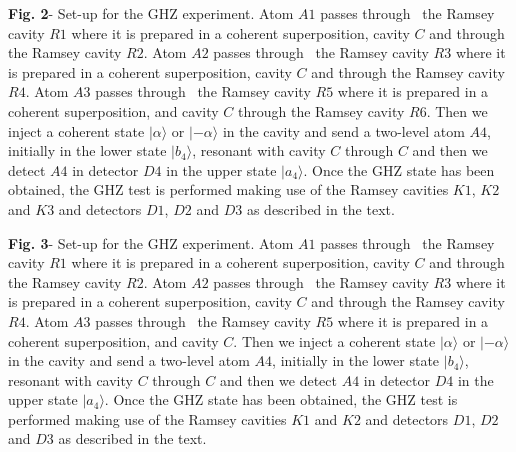 \documentclass[12pt,thmsa]{article}
\begin{document}
\textbf{Fig. 2}- Set-up for the GHZ experiment. Atom $A1$ passes through \
the Ramsey cavity $R1$ where it is prepared in a coherent superposition,
cavity $C$ and through the Ramsey cavity $R2.$ Atom $A2$ passes through \
the Ramsey cavity $R3$ where it is prepared in a coherent superposition,
cavity $C$ and through the Ramsey cavity $R4$. Atom $A3$ passes through \
the Ramsey cavity $R5$ where it is prepared in a coherent superposition, and
cavity $C$ through the Ramsey cavity $R6$. Then we inject a coherent state $%
|\alpha \rangle $ or $|-\alpha \rangle $ in the cavity and send a two-level
atom $A4$, initially in the lower state $|b_{4}\rangle $, resonant with
cavity $C$ through $C$ and then we detect $A4$ in detector $D4$ in the upper
state $|a_{4}\rangle $. Once the GHZ state has been obtained, the GHZ test
is performed making use of the Ramsey cavities $K1$, $K2$ and $K3$ and
detectors $D1$, $D2$ and $D3$ as described in the text.\bigskip

\textbf{Fig. 3}- Set-up for the GHZ experiment. Atom $A1$ passes through \
the Ramsey cavity $R1$ where it is prepared in a coherent superposition,
cavity $C$ and through the Ramsey cavity $R2.$ Atom $A2$ passes through \
the Ramsey cavity $R3$ where it is prepared in a coherent superposition,
cavity $C$ and through the Ramsey cavity $R4$. Atom $A3$ passes through \
the Ramsey cavity $R5$ where it is prepared in a coherent superposition, and
cavity $C$. Then we inject a coherent state $|\alpha \rangle $ or $|-\alpha
\rangle $ in the cavity and send a two-level atom $A4$, initially in the
lower state $|b_{4}\rangle $, resonant with cavity $C$ through $C$ and then
we detect $A4$ in detector $D4$ in the upper state $|a_{4}\rangle $. Once
the GHZ state has been obtained, the GHZ test is performed making use of the
Ramsey cavities $K1$ and $K2$ and detectors $D1$, $D2$ and $D3$ as described
in the text.\bigskip
\end{document}
